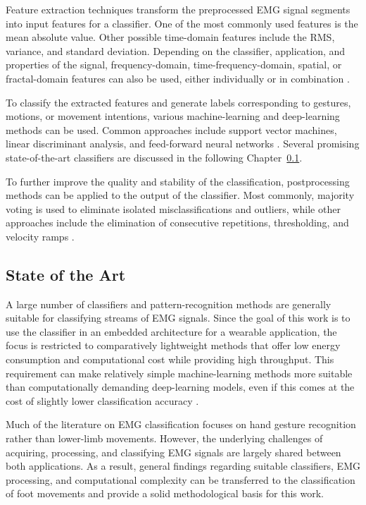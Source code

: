 Feature extraction techniques transform the preprocessed EMG signal segments into input features for a classifier. One of the most commonly used features is the mean absolute value. Other possible time-domain features include the \ac{RMS}, variance, and standard deviation. Depending on the classifier, application, and properties of the signal, frequency-domain, time-frequency-domain, spatial, or fractal-domain features can also be used, either individually or in combination \cite{jaramillo-yanez_real-time_2020}.

To classify the extracted features and generate labels corresponding to gestures, motions, or movement intentions, various machine-learning and deep-learning methods can be used. Common approaches include support vector machines, linear discriminant analysis, and feed-forward neural networks \cite{jaramillo-yanez_real-time_2020}. Several promising state-of-the-art classifiers are discussed in the following Chapter~\ref{stateOfTheArt}.  

To further improve the quality and stability of the classification, postprocessing methods can be applied to the output of the classifier. Most commonly, majority voting is used to eliminate isolated misclassifications and outliers, while other approaches include the elimination of consecutive repetitions, thresholding, and velocity ramps \cite{jaramillo-yanez_real-time_2020}.


\subsection{State of the Art}
\label{stateOfTheArt}
A large number of classifiers and pattern-recognition methods are generally suitable for classifying streams of EMG signals. Since the goal of this work is to use the classifier in an embedded architecture for a wearable application, the focus is restricted to comparatively lightweight methods that offer low energy consumption and computational cost while providing high throughput. This requirement can make relatively simple machine-learning methods more suitable than computationally demanding deep-learning models, even if this comes at the cost of slightly lower classification accuracy \cite{castruita-lopez_electromyography_2025}.

Much of the literature on EMG classification focuses on hand gesture recognition rather than lower-limb movements. However, the underlying challenges of acquiring, processing, and classifying EMG signals are largely shared between both applications. As a result, general findings regarding suitable classifiers, EMG processing, and computational complexity can be transferred to the classification of foot movements and provide a solid methodological basis for this work.



